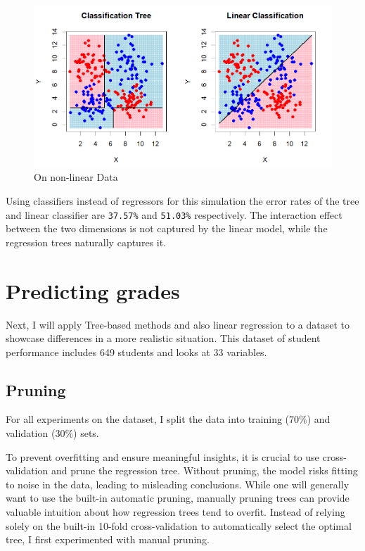 \documentclass[12pt]{article}
\begin{document}
\begin{figure}
    \centering
    \includegraphics[scale=0.30]{NLD Pred.png}
    \caption{On non-linear Data}
\end{figure}

Using classifiers instead of regressors for this simulation the error rates of the tree and linear classifier are \texttt{37.57\%} and \texttt{51.03\%} respectively. The interaction effect between the two dimensions is not captured by the linear model, while the regression trees naturally captures it.


\section{Predicting grades}

Next, I will apply Tree-based methods and also linear regression to a dataset to showcase differences in a more realistic situation. This dataset of student performance includes 649 students and looks at 33 variables.


\subsection{Pruning}

For all experiments on the dataset, I split the data into training (70\%) and validation (30\%) sets.

To prevent overfitting and ensure meaningful insights, it is crucial to use cross-validation and prune the regression tree. Without pruning, the model risks fitting to noise in the data, leading to misleading conclusions. While one will generally want to use the built-in automatic pruning, manually pruning trees can provide valuable intuition about how regression trees tend to overfit. Instead of relying solely on the built-in 10-fold cross-validation to automatically select the optimal tree, I first experimented with manual pruning.
\end{document}
